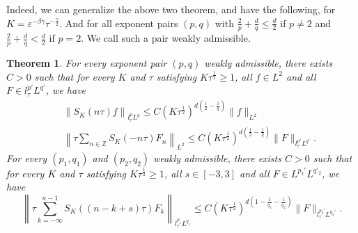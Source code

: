\documentclass[10pt,a4paper]{article}
\newtheorem{theorem}{Theorem}[section]
\begin{document}
  Indeed, we can generalize the above two theorem, and have the following, for
  \(K = \varepsilon^{-\beta\gamma} \tau^{-\frac\gamma2}\). And for all exponent
  pairs \((p,q)\) with \( \frac2p + \frac{d}q \leq \frac{d}2\) if \(p\neq2\) and
  \( \frac2p + \frac{d}q < \frac{d}2\) if \(p=2\). We call such a pair weakly
  admissible.

  \begin{theorem}\label{thmDSE} %
    For every exponent pair \((p,q)\) weakly admissible, there exists \(C>0\) such that
    for every \(K\) and \(\tau\) satisfying \(K\tau^\frac12 \geq 1\), all \(
    f \in L^2 \) and all \(F \in l^{p'}_\tau L^{q'}\), we have 
    \begin{eqnarray}
      \label{T} & & \left\| S_{K}(n \tau) f\right\|_{l^p_\tau L^q} \leq C{(K\tau^\frac12)}^{d(\frac12-\frac1q)} \|f\|_{L^2} \\
      \label{T*} & & \left\| \tau\sum_{n \in \mathbb{Z}}  S_K (-n\tau) F_n \right\|_{L^2} 
      \leq C {(K\tau^\frac12)}^{d(\frac12-\frac1q)} \|F\|_{l^{p'}_\tau L^{q'}}.
    \end{eqnarray}
    For every \((p_1, q_1)\) and \((p_2, q_2)\) weakly admissible,
    there exists \(C > 0\) such that for every \(K\) and \(\tau\) 
    satisfying \(K\tau^\frac12 \geq 1\), all \( s \in [-3,3] \) and all 
    \(F \in L^{p_2'} L^{q'_2}\), we have
    \begin{equation}\label{TT*}
      \left\| \tau \sum_{k = -\infty}^{n-1}  S_K ((n-k+s)\tau) F_k \right\|_{l^{p_1}_\tau L^{q_1}}
      \leq C (K\tau^\frac12)^{d(1-\frac1{q_1}-\frac1{q_2})}  \|F\|_{l^{p_2'}_\tau L^{q_2'}}.
    \end{equation}
  \end{theorem}
\end{document}
